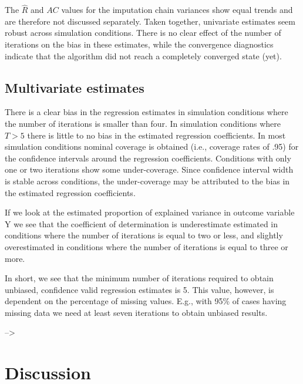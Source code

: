 \documentclass[Royal,times,sageh]{sagej}
\begin{document}
The \(\widehat{R}\) and \(AC\) values for the imputation chain variances
show equal trends and are therefore not discussed separately. Taken
together, univariate estimates seem robust across simulation conditions.
There is no clear effect of the number of iterations on the bias in
these estimates, while the convergence diagnostics indicate that the
algorithm did not reach a completely converged state (yet).

\hypertarget{multivariate-estimates}{%
\subsection{Multivariate estimates}\label{multivariate-estimates}}

There is a clear bias in the regression estimates in simulation
conditions where the number of iterations is smaller than four. In
simulation conditions where \(T > 5\) there is little to no bias in the
estimated regression coefficients. In most simulation conditions nominal
coverage is obtained (i.e., coverage rates of .95) for the confidence
intervals around the regression coefficients. Conditions with only one
or two iterations show some under-coverage. Since confidence interval
width is stable across conditions, the under-coverage may be attributed
to the bias in the estimated regression coefficients.

If we look at the estimated proportion of explained variance in outcome
variable Y we see that the coefficient of determination is underestimate
estimated in conditions where the number of iterations is equal to two
or less, and slightly overestimated in conditions where the number of
iterations is equal to three or more.

In short, we see that the minimum number of iterations required to
obtain unbiased, confidence valid regression estimates is 5. This value,
however, is dependent on the percentage of missing values. E.g., with
95\% of cases having missing data we need at least seven iterations to
obtain unbiased results.

--\textgreater{}

\hypertarget{discussion}{%
\section{Discussion}\label{discussion}}
\end{document}
